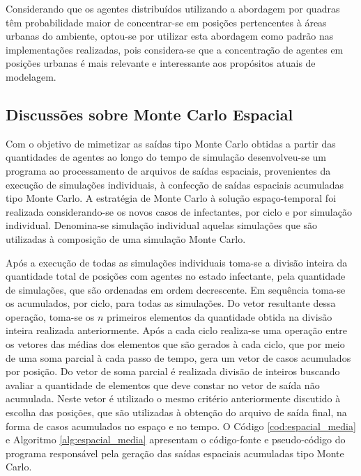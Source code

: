 Considerando que os agentes distribuídos utilizando a abordagem por quadras têm probabilidade maior de concentrar-se em posições pertencentes à áreas urbanas do ambiente, optou-se por utilizar esta abordagem como padrão nas implementações realizadas, pois considera-se que a concentração de agentes em posições urbanas é mais relevante e interessante aos propósitos atuais de modelagem. 

\subsection{Discussões sobre Monte Carlo Espacial}

Com o objetivo de mimetizar as saídas tipo Monte Carlo obtidas a partir das quantidades de agentes ao longo do tempo de simulação desenvolveu-se um programa ao processamento de arquivos de saídas espaciais, provenientes da execução de simulações individuais, à confecção de saídas espaciais acumuladas tipo Monte Carlo. A estratégia de Monte Carlo à solução espaço-temporal foi realizada considerando-se os novos casos de infectantes, por ciclo e por simulação individual. Denomina-se simulação individual aquelas simulações que são utilizadas à composição de uma simulação Monte Carlo. 

Após a execução de todas as simulações individuais toma-se a divisão inteira da quantidade total de posições com agentes no estado infectante, pela quantidade de simulações, que são ordenadas em ordem decrescente. Em sequência toma-se os acumulados, por ciclo, para todas as simulações. Do vetor resultante dessa operação, toma-se os $n$ primeiros elementos da quantidade obtida na divisão inteira realizada anteriormente. Após a cada ciclo realiza-se uma operação entre os vetores das médias dos elementos que são gerados à cada ciclo, que por meio de uma soma parcial à cada passo de tempo, gera um vetor de casos acumulados por posição. Do vetor de soma parcial é realizada divisão de inteiros buscando avaliar a quantidade de elementos que deve constar no vetor de saída não acumulada. Neste vetor é utilizado o mesmo critério anteriormente discutido à escolha das posições, que são utilizadas à obtenção do arquivo de saída final, na forma de casos acumulados no espaço e no tempo. O Código \ref{cod:espacial_media} e Algoritmo \ref{alg:espacial_media} apresentam o código-fonte e pseudo-código do programa responsável pela geração das saídas espaciais acumuladas tipo Monte Carlo. 



